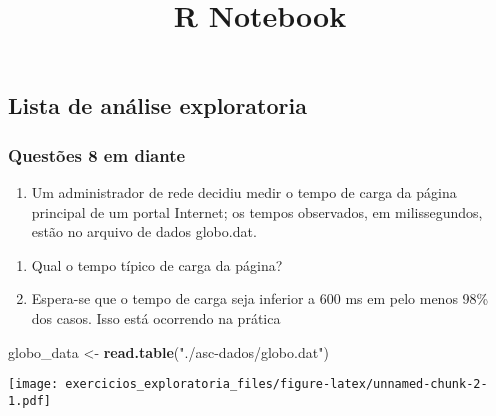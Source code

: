 \documentclass[
]{article}
\title{R Notebook}
\author{}
\date{\vspace{-2.5em}}
\newenvironment{Shaded}{\begin{snugshade}}{\end{snugshade}}
\newcommand{\FunctionTok}[1]{\textcolor[rgb]{0.13,0.29,0.53}{\textbf{#1}}}
\newcommand{\NormalTok}[1]{#1}
\newcommand{\OtherTok}[1]{\textcolor[rgb]{0.56,0.35,0.01}{#1}}
\newcommand{\SpecialCharTok}[1]{\textcolor[rgb]{0.81,0.36,0.00}{\textbf{#1}}}
\newcommand{\StringTok}[1]{\textcolor[rgb]{0.31,0.60,0.02}{#1}}
\providecommand{\tightlist}{%
  \setlength{\itemsep}{0pt}\setlength{\parskip}{0pt}}
\begin{document}
\maketitle

\hypertarget{lista-de-anuxe1lise-exploratoria}{%
\subsection{Lista de análise
exploratoria}\label{lista-de-anuxe1lise-exploratoria}}

\hypertarget{questuxf5es-8-em-diante}{%
\subsubsection{Questões 8 em diante}\label{questuxf5es-8-em-diante}}

\begin{enumerate}
\def\labelenumi{\arabic{enumi}.}
\setcounter{enumi}{7}
\tightlist
\item
  Um administrador de rede decidiu medir o tempo de carga da página
  principal de um portal Internet; os tempos observados, em
  milissegundos, estão no arquivo de dados globo.dat.
\end{enumerate}

\begin{enumerate}
\def\labelenumi{(\alph{enumi})}
\tightlist
\item
  Qual o tempo típico de carga da página?
\item
  Espera-se que o tempo de carga seja inferior a 600 ms em pelo menos
  98\% dos casos. Isso está ocorrendo na prática
\end{enumerate}

\begin{Shaded}
\begin{Highlighting}[]
\NormalTok{globo\_data }\OtherTok{\textless{}{-}} \FunctionTok{read.table}\NormalTok{(}\StringTok{"./asc{-}dados/globo.dat"}\NormalTok{)}
\end{Highlighting}
\end{Shaded}

\begin{Shaded}
\end{Shaded}

\texttt{[image: exercicios\_exploratoria\_files/figure-latex/unnamed-chunk-2-1.pdf]}
\end{document}
